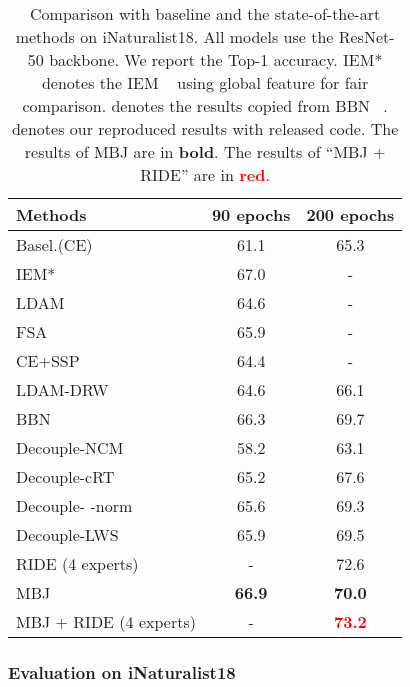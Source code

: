 \documentclass[final]{cvpr}
\begin{document}
\begin{table}[h]
\small 
	\centering
	\begin{tabular}{l|cc}
		\hline
		Methods               & 90 epochs & 200 epochs \\ \hline
		Basel.(CE)                    & 61.1      & 65.3          \\
IEM* ~\cite{IEM}                   & 67.0      & -          \\
		LDAM ~\cite{LDAM}                  & 64.6      & -          \\
	    FSA ~\cite{chu2020feature}         & 65.9      & -          \\
	    CE+SSP ~\cite{yang2020rethinking}  & 64.4      & -         \\
		LDAM-DRW  ~\cite{LDAM}        & 64.6     & 66.1          \\
		BBN ~\cite{BBN}                 & 66.3      & 69.7       \\
		Decouple-NCM ~\cite{decoupling}         & 58.2      & 63.1       \\
		Decouple-cRT ~\cite{decoupling}         & 65.2      & 67.6       \\
		Decouple- -norm ~\cite{decoupling} & 65.6      & 69.3       \\
		Decouple-LWS ~\cite{decoupling}         & 65.9      & 69.5       \\
		RIDE (4 experts) ~\cite{wang2020long}                                   & -         & 72.6       \\
		\hline
		MBJ                   & \textbf{66.9}      & \textbf{70.0}       \\ 
	    MBJ + RIDE (4 experts)       & -             & \textbf{\textcolor{red}{73.2}} \\
		\hline
	\end{tabular}
	\caption{Comparison with baseline and the state-of-the-art methods on iNaturalist18. All models use the ResNet-50 \cite{resnet} backbone. We report the Top-1 accuracy. IEM* denotes the IEM ~\cite{IEM} using global feature for fair comparison.  denotes the results copied from BBN ~\cite{BBN}.   denotes our reproduced results with released code. The results of MBJ are in \textbf{bold}. The results of ``MBJ + RIDE'' are in \textbf{\textcolor{red}{red}}.}  
	\label{tab:ina}
	\vspace{-6mm}
\end{table}

\subsubsection{Evaluation on iNaturalist18}
\end{document}
